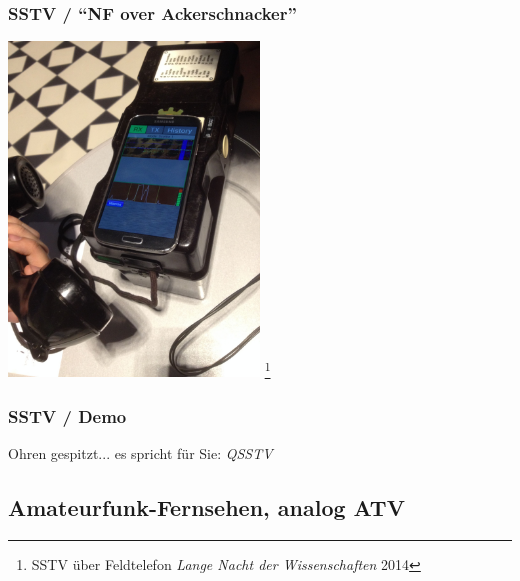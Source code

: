 \begin{frame}
    \frametitle{SSTV / ``NF over Ackerschnacker''}

    \begin{center}
        \includegraphics[width=0.5\textwidth,height=.8\textheight,keepaspectratio]{e16/SSTV-over-Ackerschnacker_LNDW2014.jpg}
        \footnote{SSTV über Feldtelefon \emph{Lange Nacht der Wissenschaften} 2014}
    \end{center}

\end{frame}

\begin{frame}
    \frametitle{SSTV / Demo}

    \Large{Ohren gespitzt... es spricht für Sie: \emph{QSSTV}}

\end{frame}

\subsection[ATV]{Amateurfunk-Fernsehen, analog ATV}

